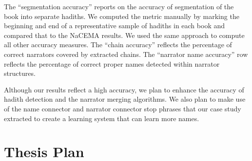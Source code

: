 \documentclass[a4,12pt]{report}
\begin{document}
The ``segmentation accuracy'' reports on the accuracy of 
segmentation of the book into separate hadiths.
We computed the metric manually by marking the beginning 
and end of a representative sample of hadiths in each 
book and compared that to the NaCEMA results. 
We used the same approach to compute all other accuracy measures.
The ``chain accuracy'' reflects the percentage of correct narrators 
covered by extracted chains.
The ``narrator name accuracy'' row reflects the percentage of 
correct proper names detected within
narrator structures.



Although our results reflect a high accuracy, we plan to 
enhance the accuracy of hadith detection and the 
narrator merging algorithms. We also plan to make use of the name connector and narrator
connector stop phrases that our case study extracted to create a 
learning system that can learn more names. 

\chapter{Thesis Plan}
\end{document}
